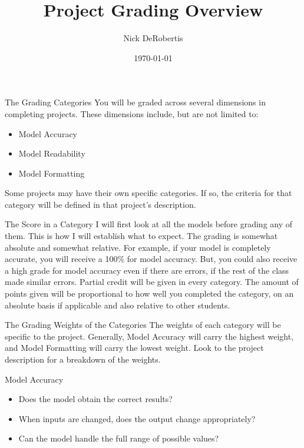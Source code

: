 \documentclass[]{article}
\begin{document}
\title{Project Grading Overview}
\author{Nick DeRobertis}
\date{\today}
\maketitle
\begin{section}{The Grading Categories}
You will be graded across several dimensions in completing projects. These dimensions include, but are not limited to: 
\begin{itemize}
\item Model Accuracy
\item Model Readability
\item Model Formatting
\end{itemize}
Some projects may have their own specific categories. If so, the criteria for that category will be defined in that project's description.
\end{section}
\begin{section}{The Score in a Category}
I will first look at all the models before grading any of them. This is how I will establish what to expect. The grading is somewhat absolute and somewhat relative. For example, if your model is completely accurate, you will receive a 100\% for model accuracy. But, you could also receive a high grade for model accuracy even if there are errors, if the rest of the class made similar errors. Partial credit will be given in every category. The amount of points given will be proportional to how well you completed the category, on an absolute basis if applicable and also relative to other students.
\end{section}
\begin{section}{The Grading Weights of the Categories}
The weights of each category will be specific to the project. Generally, Model Accuracy will carry the highest weight, and Model Formatting will carry the lowest weight. Look to the project description for a breakdown of the weights.
\end{section}
\begin{section}{Model Accuracy}
\begin{itemize}
\item Does the model obtain the correct results?
\item When inputs are changed, does the output change appropriately?
\item Can the model handle the full range of possible values?
\end{itemize}
\end{section}
\end{document}
